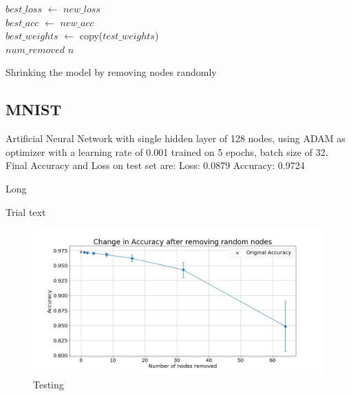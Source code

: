 \documentclass[UKenglish]{ifimaster}
\begin{document}
\begin{algorithm}
{{{                        $best\_loss$ $\leftarrow$ $new\_loss$\\
                        $best\_acc$ $\leftarrow$ $new\_acc$\\
                        $best\_weights$ $\leftarrow$ copy($test\_weights$)\\
                        \Inc $num\_removed$ \By $n$\\
                    }
                }
            }
            \caption[Short]{Shrinking the model by removing nodes randomly}
        \end{algorithm}

        \subsection{MNIST}
            Artificial Neural Network with single hidden layer of 128 nodes, using ADAM as optimizer with a learning rate of 0.001 trained on 5 epochs, batch size of 32.
            Final Accuracy and Loss on test set are:
            Loss: 0.0879
            Accuracy: 0.9724

            \begin{table}[h!]
                \centering
                \resizebox{\textwidth}{!}{}
                \caption[Short]{Long}
                \label{tab:ac_rnd_rem_mnist}
            \end{table}

            Trial text

            \begin{figure}[h!]\centering
                \includegraphics[width=\textwidth]{Accuracy_change_random_removal_mnist.png}
                \caption[Short title]{Testing}
                \label{fig:acc_rn_mnist}
            \end{figure}
\end{document}
